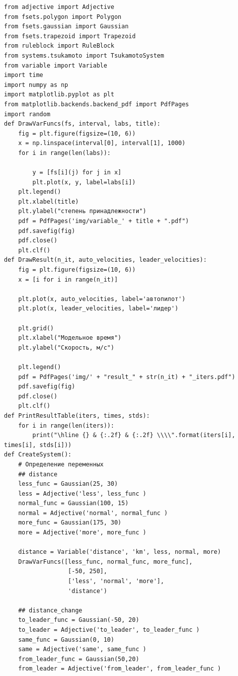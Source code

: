 \documentclass[12pt]{report}
\begin{document}
\begin{lstlisting}[label=lst:dt,caption=Реализация решения поставленной задачи]
from adjective import Adjective
from fsets.polygon import Polygon
from fsets.gaussian import Gaussian
from fsets.trapezoid import Trapezoid
from ruleblock import RuleBlock
from systems.tsukamoto import TsukamotoSystem
from variable import Variable
import time
import numpy as np
import matplotlib.pyplot as plt
from matplotlib.backends.backend_pdf import PdfPages
import random
def DrawVarFuncs(fs, interval, labs, title):
    fig = plt.figure(figsize=(10, 6))
    x = np.linspace(interval[0], interval[1], 1000)
    for i in range(len(labs)):
        
        y = [fs[i](j) for j in x]
        plt.plot(x, y, label=labs[i])
    plt.legend()
    plt.xlabel(title)
    plt.ylabel("степень принадлежности")
    pdf = PdfPages('img/variable_' + title + ".pdf")
    pdf.savefig(fig)
    pdf.close()
    plt.clf()
def DrawResult(n_it, auto_velocities, leader_velocities):
    fig = plt.figure(figsize=(10, 6))
    x = [i for i in range(n_it)]

    plt.plot(x, auto_velocities, label='автопилот')
    plt.plot(x, leader_velocities, label='лидер')

    plt.grid()
    plt.xlabel("Модельное время")
    plt.ylabel("Скорость, м/с")

    plt.legend()
    pdf = PdfPages('img/' + "result_" + str(n_it) + "_iters.pdf")
    pdf.savefig(fig)
    pdf.close()
    plt.clf()
def PrintResultTable(iters, times, stds):
    for i in range(len(iters)):
        print("\hline {} & {:.2f} & {:.2f} \\\\".format(iters[i], times[i], stds[i]))
def CreateSystem():
    # Определение переменных
    ## distance
    less_func = Gaussian(25, 30)
    less = Adjective('less', less_func )
    normal_func = Gaussian(100, 15)
    normal = Adjective('normal', normal_func )
    more_func = Gaussian(175, 30)
    more = Adjective('more', more_func )
    
    distance = Variable('distance', 'km', less, normal, more)
    DrawVarFuncs([less_func, normal_func, more_func],
                  [-50, 250],
                  ['less', 'normal', 'more'],
                  'distance')

    ## distance_change
    to_leader_func = Gaussian(-50, 20)
    to_leader = Adjective('to_leader', to_leader_func )
    same_func = Gaussian(0, 10)
    same = Adjective('same', same_func )
    from_leader_func = Gaussian(50,20)
    from_leader = Adjective('from_leader', from_leader_func )
    

\end{lstlisting}
\end{document}
